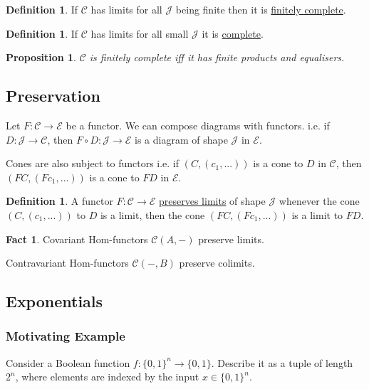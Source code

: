 \documentclass[11pt]{article} %
\newtheorem{proposition}[theorem]{Proposition}
\theoremstyle{definition}
\newtheorem{definition}[theorem]{Definition}
\theoremstyle{definition}
\newtheorem{fact}[theorem]{Fact}
\theoremstyle{definition}
\begin{document}
\begin{definition}
    If $\mathcal{C}$ has limits for all $\mathcal{J}$ being finite then it is \underline{finitely complete}.
\end{definition}
\begin{definition}
    If $\mathcal{C}$ has limits for all small $\mathcal{J}$ it is \underline{complete}.
\end{definition}

\begin{proposition}
    $\mathcal{C}$ is finitely complete iff it has finite products and equalisers.
\end{proposition}

\subsection{Preservation}
Let $F:\mathcal{C}\rightarrow\mathcal{E}$ be a functor.
We can compose diagrams with functors.
i.e. if $D:\mathcal{J} \rightarrow \mathcal{C}$, then $F\circ D:\mathcal{J}\rightarrow\mathcal{E}$
is a diagram of shape $\mathcal{J}$ in $\mathcal{E}$.

Cones are also subject to functors
i.e. if $(C,(c_1,...))$ is a cone to $D$ in $\mathcal{C}$,
then $(FC, (Fc_1,...))$ is a cone to $FD$ in $\mathcal{E}$.

\begin{definition}
    A functor $F:\mathcal{C}\rightarrow\mathcal{E}$ \underline{preserves limits} of shape $\mathcal{J}$
    whenever the cone $(C,(c_1,...))$ to $D$ is a limit, 
    then the cone $(FC, (Fc_1,...))$ is a limit to $FD$.
\end{definition}

\begin{fact}
    Covariant Hom-functors $\mathcal{C}(A,-)$ preserve limits.

    Contravariant Hom-functors $\mathcal{C}(-,B)$ preserve colimits.
\end{fact}

\subsection{Exponentials}
\subsubsection{Motivating Example}
Consider a Boolean function $f:\{0,1\}^n \rightarrow \{0,1\}$.
Describe it as a tuple of length $2^n$, where elements are indexed by the input $x\in\{0,1\}^n$.
\end{document}
